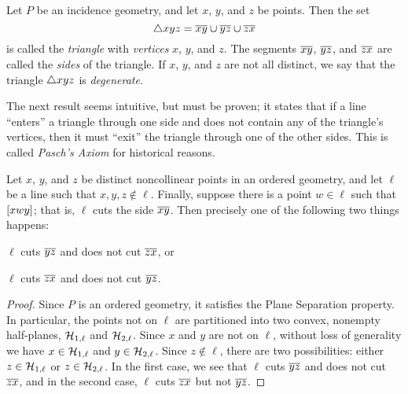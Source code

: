\begin{dfn}[Triangle]
Let \(P\) be an incidence geometry, and let \(x\), \(y\), and \(z\) be points.
Then the set \[ \bigtriangleup{xyz} = \overline{xy} \cup \overline{yz} \cup \overline{zx} \] is called the \emph{triangle} with \emph{vertices} \(x\), \(y\), and \(z\).
The segments \(\overline{xy}\), \(\overline{yz}\), and \(\overline{zx}\) are called the \emph{sides} of the triangle.
If \(x\), \(y\), and \(z\) are not all distinct, we say that the triangle \(\bigtriangleup{xyz}\) is \emph{degenerate}.
\end{dfn}

The next result seems intuitive, but must be proven; it states that if a line ``enters'' a triangle through one side and does not contain any of the triangle's vertices, then it must ``exit'' the triangle through one of the other sides.
This is called \emph{Pasch's Axiom} for historical reasons.

\begin{prop}
Let \(x\), \(y\), and \(z\) be distinct noncollinear points in an ordered geometry, and let \(\ell\) be a line such that \(x,y,z \notin \ell\).
Finally, suppose there is a point \(w \in \ell\) such that \([ x w y ]\); that is, \(\ell\) cuts the side \(\overline{xy}\).
Then precisely one of the following two things happens:
\begin{proplist}
\item \(\ell\) cuts \(\overline{yz}\) and does not cut \(\overline{zx}\), or
\item \(\ell\) cuts \(\overline{zx}\) and does not cut \(\overline{yz}\).
\end{proplist}
\end{prop}

\begin{proof}
Since \(P\) is an ordered geometry, it satisfies the Plane Separation property.
In particular, the points not on \(\ell\) are partitioned into two convex, nonempty half-planes, \(\mathcal{H}_{1,\ell}\) and \(\mathcal{H}_{2,\ell}\).
Since \(x\) and \(y\) are not on \(\ell\), without loss of generality we have \(x \in \mathcal{H}_{1,\ell}\) and \(y \in \mathcal{H}_{2,\ell}\).
Since \(z \notin \ell\), there are two possibilities: either \(z \in \mathcal{H}_{1,\ell}\) or \(z \in \mathcal{H}_{2,\ell}\).
In the first case, we see that \(\ell\) cuts \(\overline{yz}\) and does not cut \(\overline{zx}\), and in the second case, \(\ell\) cuts \(\overline{zx}\) but not \(\overline{yz}\).
\end{proof}

